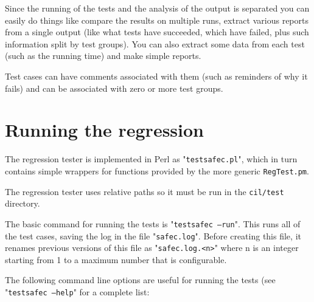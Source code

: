 \documentclass{book}
\def\t#1{{\tt #1}}
\begin{document}
 Since the running of the tests and the analysis of the output is separated
you can easily do things like compare the results on multiple runs, extract
various reports from a single output (like what tests have succeeded, which
have failed, plus such information split by test groups). You can also extract
some data from each test (such as the running time) and make simple reports. 

 Test cases can have comments associated with them (such as reminders of why
it fails) and can be associated with zero or more test groups.

 \section{Running the regression}

 The regression tester is implemented in Perl as "\t{testsafec.pl}", which in
turn contains simple wrappers for functions provided by the more generic
\t{RegTest.pm}.

 The regression tester uses relative paths so it must be run in the
 \t{cil/test} directory.

 The basic command for running the tests is "\t{testsafec --run}". This runs
all of the test cases, saving the log in the file "\t{safec.log}". Before
creating this file, it renames previous versions of this file as
"\t{safec.log.<n>}" where n is an integer starting from 1 to a maximum number
that is configurable.

 The following command line options are useful for running the tests (see
 "\t{testsafec --help}" for a complete list:
\end{document}
